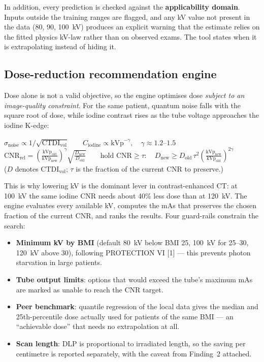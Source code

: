 \documentclass[10pt,a4paper]{article}
\newcommand{\ctdi}{\ensuremath{\mathrm{CTDI}_{\mathrm{vol}}}}
\begin{document}
In addition, every prediction is checked against the \textbf{applicability domain}. Inputs outside the training
ranges are flagged, and any kV value not present in the data (80, 90, 100~kV) produces an explicit warning that the
estimate relies on the fitted physics kV-law rather than on observed exams. The tool states when it is
extrapolating instead of hiding it.

\subsection{Dose-reduction recommendation engine}
Dose alone is not a valid objective, so the engine optimises dose \textit{subject to an image-quality constraint}.
For the same patient, quantum noise falls with the square root of dose, while iodine contrast rises as the tube
voltage approaches the iodine K-edge:

\begin{eqbox}
$\displaystyle \sigma_{\text{noise}} \propto 1/\sqrt{\ctdi} \qquad
C_{\text{iodine}} \propto \mathrm{kVp}^{-\gamma},\quad \gamma \approx 1.2\text{--}1.5$\\[4pt]
$\displaystyle \mathrm{CNR_{rel}} = \left(\frac{\mathrm{kVp_{old}}}{\mathrm{kVp_{new}}}\right)^{\!\gamma}
\sqrt{\frac{D_{\mathrm{new}}}{D_{\mathrm{old}}}}
\qquad\text{hold } \mathrm{CNR} \ge \tau:\quad
D_{\mathrm{new}} \ge D_{\mathrm{old}}\,\tau^{2}
\left(\frac{\mathrm{kVp_{new}}}{\mathrm{kVp_{old}}}\right)^{\!2\gamma}$\\[3pt]
{\footnotesize\color{ctink2}($D$ denotes \ctdi{}; $\tau$ is the fraction of the current CNR to preserve.)}
\end{eqbox}

This is why lowering kV is the dominant lever in contrast-enhanced CT: at 100~kV the same iodine CNR needs about
40\% less dose than at 120~kV. The engine evaluates every available kV, computes the mAs that preserves the chosen
fraction of the current CNR, and ranks the results. Four guard-rails constrain the search:
\begin{itemize}
\item \textbf{Minimum kV by BMI} (default 80~kV below BMI 25, 100~kV for 25--30, 120~kV above 30), following
PROTECTION VI [1] --- this prevents photon starvation in large patients.
\item \textbf{Tube output limits}: options that would exceed the tube's maximum mAs are marked as unable to reach
the CNR target.
\item \textbf{Peer benchmark}: quantile regression of the local data gives the median and 25th-percentile dose
actually used for patients of the same BMI --- an ``achievable dose'' that needs no extrapolation at all.
\item \textbf{Scan length}: DLP is proportional to irradiated length, so the saving per centimetre is reported
separately, with the caveat from Finding~2 attached.
\end{itemize}
\end{document}
